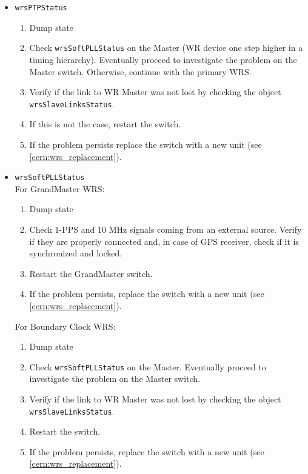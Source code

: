 \begin{itemize}
  \item \texttt{wrsPTPStatus}
    \begin{enumerate}
      \item Dump state
      \item Check \texttt{wrsSoftPLLStatus} on the Master (WR device one step
        higher in a timing hierarchy). Eventually proceed to investigate the
        problem on the Master switch. Otherwise, continue with the primary WRS.
      \item Verify if the link to WR Master was not lost by checking the object
        \texttt{wrsSlaveLinksStatus}.
      \item If this is not the case, restart the switch.
      \item If the problem persists replace the switch with a new unit (see
        \ref{cern:wrs_replacement}).
    \end{enumerate}

  \item \texttt{wrsSoftPLLStatus}\\
    For GrandMaster WRS:
    \begin{enumerate}
      \item Dump state
      \item Check 1-PPS and 10 MHz signals coming from an external source.
        Verify if they are properly connected and, in case of GPS receiver,
        check if it is synchronized and locked.
      \item Restart the GrandMaster switch.
      \item If the problem persists, replace the switch with a new unit (see
        \ref{cern:wrs_replacement}).
    \end{enumerate}

    For Boundary Clock WRS:
    \begin{enumerate}
      \item Dump state
      \item Check \texttt{wrsSoftPLLStatus} on the Master. Eventually proceed to
        investigate the problem on the Master switch.
      \item Verify if the link to WR Master was not lost by checking the object
        \texttt{wrsSlaveLinksStatus}.
      \item Restart the switch.
      \item If the problem persists, replace the switch with a new unit (see
        \ref{cern:wrs_replacement}).
    \end{enumerate}


\end{itemize}
